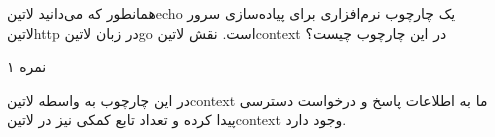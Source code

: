 
همانطور که می‌دانید ‌لاتین{echo} یک چارچوب نرم‌افزاری برای پیاده‌سازی سرور ‌لاتین{http} در زبان ‌لاتین{go} است.
نقش ‌لاتین{context} در این چارچوب چیست؟

۱ نمره

\begin{پاسخ}

در این چارچوب به واسطه ‌لاتین{context} ما به اطلاعات پاسخ و درخواست دسترسی پیدا کرده و تعداد تابع کمکی نیز در ‌لاتین{context} وجود دارد.

\end{پاسخ}
